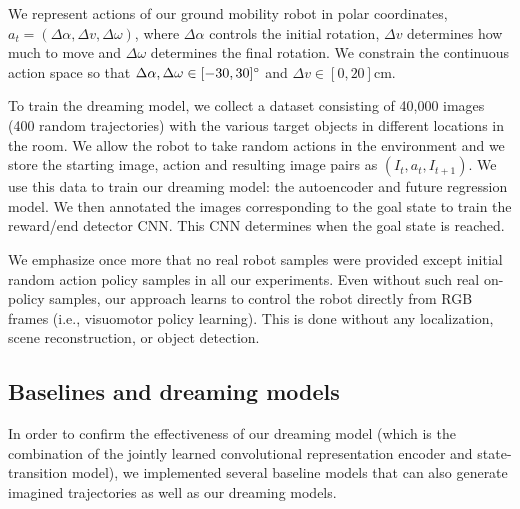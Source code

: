 \documentclass[letterpaper, 10 pt, conference]{ieeeconf}
\begin{document}
We represent actions of our ground mobility robot in polar coordinates, $a_t = (\Delta\alpha, \Delta v, \Delta\omega)$, where $\Delta\alpha$ controls the initial rotation, $\Delta v$ determines how much to move and $\Delta\omega$ determines the final rotation. We constrain the continuous action space so that $\Delta\alpha,\Delta\omega\in [-30, 30]\degree$ and $\Delta v\in [0,20]$cm.%

To train the dreaming model, we collect a dataset consisting of 40,000 images (400 random trajectories) with the various target objects in different locations in the room. We allow the robot to take random actions in the environment and we store the starting image, action and resulting image pairs as $(I_t, a_t, I_{t+1})$. We use this data to train our dreaming model: the autoencoder and future regression model. 
We then annotated the images corresponding to the goal state to train the reward/end detector CNN. This CNN determines when the goal state is reached.

We emphasize once more that no real robot samples were provided except initial random action policy samples in all our experiments. Even without such real on-policy samples, our approach learns to control the robot directly from RGB frames (i.e., visuomotor policy learning). This is done without any localization, scene reconstruction, or object detection.

\subsection{Baselines and dreaming models}

In order to confirm the effectiveness of our dreaming model (which is the combination of the jointly learned convolutional representation encoder and state-transition model), we implemented several baseline models that can also generate imagined trajectories as well as our dreaming models.

\end{document}
